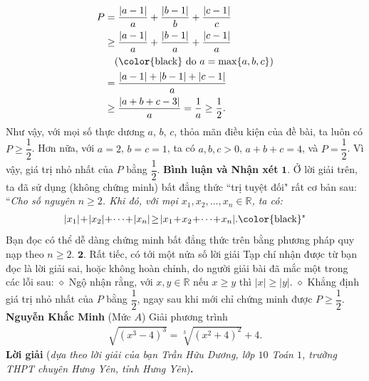 \begin{multicols}{2}
	\begin{align*}
			P &= \frac{{\left| {a - 1} \right|}}{a} + \frac{{\left| {b - 1} \right|}}{b} + \frac{{\left| {c - 1} \right|}}{c} \\
			&\ge \frac{{\left| {a - 1} \right|}}{a} + \frac{{\left| {b - 1} \right|}}{a} + \frac{{\left| {c - 1} \right|}}{a}\\
			&\quad({\text{\color{black} do } } a = \max \{ a,b,c\} )\\
			 &= \frac{{\left| {a - 1} \right| + \left| {b - 1} \right| + \left| {c - 1} \right|}}{a} \\
			 &\ge \frac{{\left| {a + b + c - 3} \right|}}{a} = \frac{1}{a} \ge \frac{1}{2}.
	\end{align*}
	Như vậy, với mọi số thực dương $a$, $b$, $c$, thỏa mãn điều kiện của đề bài, ta luôn có  $P \ge \dfrac{1}{2}$.
	\vskip 0.05cm
	Hơn nữa, với $a \!=\! 2$, $b \!=\! c \!=\! 1$, ta có $a, b, c \!>\! 0$, $a + b + c = 4$, và  $P = \dfrac{1}{2}$.
	\vskip 0.05cm
	Vì vậy, giá trị nhỏ nhất của $P$ bằng  $\dfrac{1}{2}$.
	\vskip 0.05cm
	\textbf{\color{thachthuctoanhoc}Bình luận và Nhận xét}
	\vskip 0.05cm
	$\pmb{1.}$ Ở lời giải trên, ta đã sử dụng (không chứng minh) bất đẳng thức ``trị tuyệt đối" rất cơ bản sau:
	\vskip 0.05cm
	``\textit{Cho số nguyên $n \ge 2$. Khi đó, với mọi  $x_1, x_2, \ldots,x_n \in \mathbb{R}$, ta có:}
	\begin{align*}
		|{x_1}| \!+\! |{x_2}| \!+\!  \cdots  \!+\! |{x_n}| \!\ge\! |{x_1} \!+\! {x_2} \!+\!  \cdots  \!+\! {x_n}|. \text{\color{black}"}
	\end{align*}
	Bạn đọc có thể dễ dàng chứng minh bất đẳng thức trên bằng phương pháp quy nạp theo $n \ge 2$.
	\vskip 0.05cm
	$\pmb{2.}$ Rất tiếc, có tới một nửa số lời giải Tạp chí nhận được từ bạn đọc là lời giải sai, hoặc không hoàn chỉnh, do người giải bài đã mắc một trong các lỗi sau:
	\vskip 0.05cm
	$\diamond$ Ngộ nhận rằng, với  $x,y \in \mathbb{R}$ nếu $x \ge y$ thì $|x|\ge |y|$.
	\vskip 0.05cm 
	$\diamond$ Khẳng định giá trị nhỏ nhất của $P$ bằng  $\dfrac{1}{2}$, ngay sau khi mới chỉ chứng minh được  $P \ge \dfrac{1}{2}$.
	\vskip 0.05cm
	\hfill	\textbf{\color{thachthuctoanhoc}Nguyễn Khắc Minh}
	\vskip 0.05cm
	{}
	(Mức $A$) Giải phương trình
	\begin{align*}
		\sqrt{(x^3-4)^3}=\sqrt[3]{(x^2+4)^2}+4.
	\end{align*} 
	\textbf{\color{thachthuctoanhoc}Lời giải} (\textit{dựa theo lời giải của bạn Trần Hữu Dương, lớp $10$ Toán $1$, trường THPT chuyên Hưng Yên, tỉnh Hưng Yên})\textbf{\color{thachthuctoanhoc}.}

\end{multicols}
